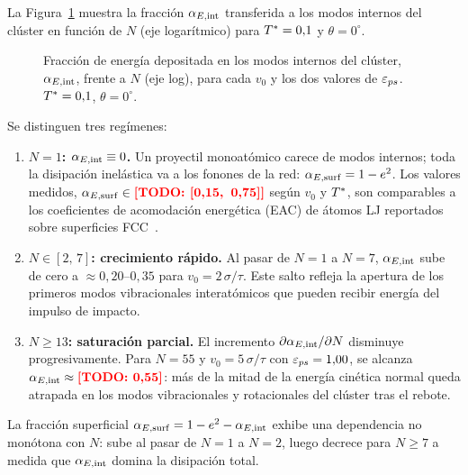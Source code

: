 La Figura~\ref{fig:alpha_N} muestra la fracción $\alpha_{E,\mathrm{int}}$ transferida a los
modos internos del clúster en función de $N$ (eje logarítmico) para
$T^{*}=0{,}1$ y $\theta=0^\circ$.

\begin{figure}[ht]
    \centering
    \caption{Fracción de energía depositada en los modos internos del clúster,
    $\alpha_{E,\mathrm{int}}$, frente a $N$ (eje log), para cada $v_0$ y los dos valores de
    $\varepsilon_{ps}$. $T^{*}=0{,}1$, $\theta=0^\circ$.}
    \label{fig:alpha_N}
\end{figure}

Se distinguen tres regímenes:

\begin{enumerate}

    \item \textbf{$N=1$: $\alpha_{E,\mathrm{int}} \equiv 0$.} Un proyectil monoatómico
    carece de modos internos; toda la disipación inelástica va a los fonones
    de la red: $\alpha_{E,\mathrm{surf}} = 1 - e^2$. Los valores medidos,
    $\alpha_{E,\mathrm{surf}} \in \textcolor{red}{\textbf{[TODO: [0{,}15,\, 0{,}75]]}}$ según $v_0$ y $T^{*}$, son
    comparables a los coeficientes de acomodación energética (EAC) de átomos
    LJ reportados sobre superficies FCC~\cite{adelman1976}.

    \item \textbf{$N \in [2,\, 7]$: crecimiento rápido.} Al pasar de $N=1$
    a $N=7$, $\alpha_{E,\mathrm{int}}$ sube de cero a $\approx 0{,}20$--$0{,}35$ para
    $v_0 = 2\,\sigma/\tau$. Este salto refleja la apertura de los primeros
    modos vibracionales interatómicos que pueden recibir energía del impulso
    de impacto.

    \item \textbf{$N \geq 13$: saturación parcial.} El incremento
    $\partial\alpha_{E,\mathrm{int}}/\partial N$ disminuye progresivamente. Para $N=55$ y
    $v_0 = 5\,\sigma/\tau$ con $\varepsilon_{ps}=1{,}00$, se alcanza
    $\alpha_{E,\mathrm{int}} \approx \textcolor{red}{\textbf{[TODO: 0{,}55]}}$: más de la mitad de la energía cinética
    normal queda atrapada en los modos vibracionales y rotacionales del clúster
    tras el rebote.

\end{enumerate}

La fracción superficial $\alpha_{E,\mathrm{surf}} = 1 - e^2 - \alpha_{E,\mathrm{int}}$ exhibe una
dependencia no monótona con $N$: sube al pasar de $N=1$ a $N=2$, luego
decrece para $N \geq 7$ a medida que $\alpha_{E,\mathrm{int}}$ domina la disipación total.

